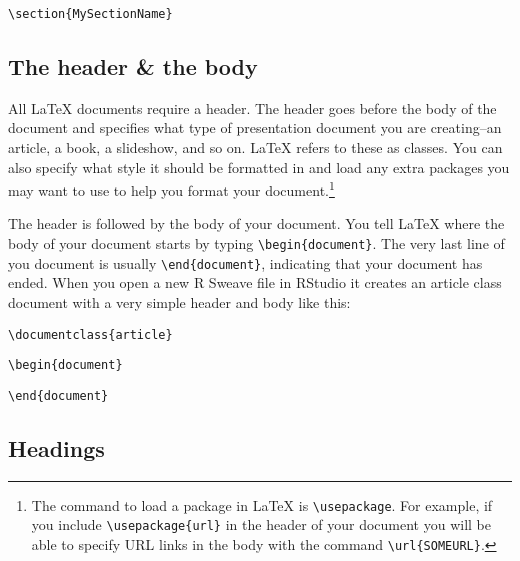 \begin{knitrout}
\color{fgcolor}\begin{kframe}
\begin{alltt}
\textbackslash{}section\{My Section Name\}
\end{alltt}
\end{kframe}
\end{knitrout}


\subsection{The header \& the body}

All LaTeX documents require a header. The header goes before the body of the document and specifies what type of presentation document you are creating--an article, a book, a slideshow, and so on. LaTeX refers to these as classes. You can also specify what style it should be formatted in and load any extra packages you may want to use to help you format your document.\footnote{The command to load a package in LaTeX is \texttt{\textbackslash{}usepackage}. For example, if you include \texttt{\textbackslash{}usepackage\{url\}} in the header of your document you will be able to specify URL links in the body with the command \texttt{\textbackslash{}url\{SOMEURL\}}.}

The header is followed by the body of your document. You tell LaTeX where the body of your document starts by typing \texttt{\textbackslash{}begin\{document\}}. The very last line of you document is usually \texttt{\textbackslash{}end\{document\}}, indicating that your document has ended. When you open a new R Sweave file in RStudio it creates an article class document with a very simple header and body like this:

\begin{knitrout}
\color{fgcolor}\begin{kframe}
\begin{alltt}
\textbackslash{}documentclass\{article\}

\textbackslash{}begin\{document\}


\textbackslash{}end\{document\}
\end{alltt}
\end{kframe}
\end{knitrout}


\subsection{Headings}


